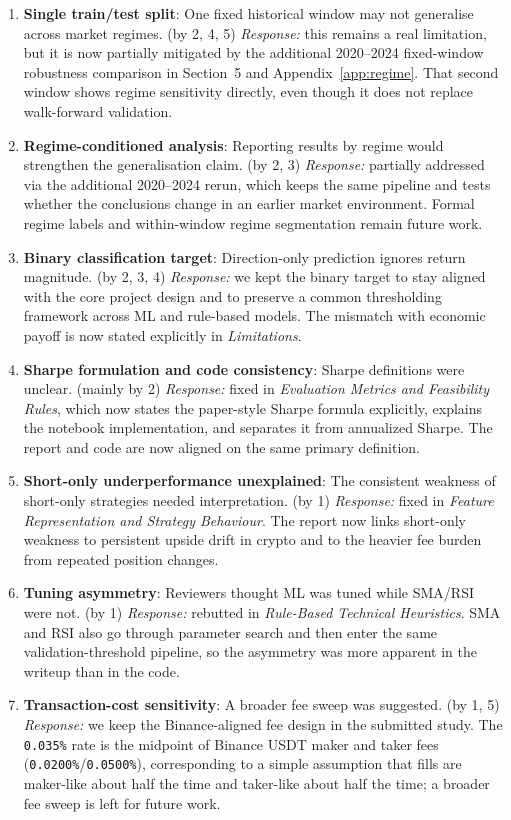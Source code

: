 \documentclass[12pt]{article}
\begin{document}
\begin{enumerate}[leftmargin=1.5em]
    \item \textbf{Single train/test split}: One fixed historical window may not generalise across market regimes. (by 2, 4, 5) \textit{Response:} this remains a real limitation, but it is now partially mitigated by the additional 2020--2024 fixed-window robustness comparison in Section~5 and Appendix~\ref{app:regime}. That second window shows regime sensitivity directly, even though it does not replace walk-forward validation.
    \item \textbf{Regime-conditioned analysis}: Reporting results by regime would strengthen the generalisation claim. (by 2, 3) \textit{Response:} partially addressed via the additional 2020--2024 rerun, which keeps the same pipeline and tests whether the conclusions change in an earlier market environment. Formal regime labels and within-window regime segmentation remain future work.
    \item \textbf{Binary classification target}: Direction-only prediction ignores return magnitude. (by 2, 3, 4) \textit{Response:} we kept the binary target to stay aligned with the core project design and to preserve a common thresholding framework across ML and rule-based models. The mismatch with economic payoff is now stated explicitly in \emph{Limitations}.
    \item \textbf{Sharpe formulation and code consistency}: Sharpe definitions were unclear. (mainly by 2) \textit{Response:} fixed in \emph{Evaluation Metrics and Feasibility Rules}, which now states the paper-style Sharpe formula explicitly, explains the notebook implementation, and separates it from annualized Sharpe. The report and code are now aligned on the same primary definition.
    \item \textbf{Short-only underperformance unexplained}: The consistent weakness of short-only strategies needed interpretation. (by 1) \textit{Response:} fixed in \emph{Feature Representation and Strategy Behaviour}. The report now links short-only weakness to persistent upside drift in crypto and to the heavier fee burden from repeated position changes.
    \item \textbf{Tuning asymmetry}: Reviewers thought ML was tuned while SMA/RSI were not. (by 1) \textit{Response:} rebutted in \emph{Rule-Based Technical Heuristics}. SMA and RSI also go through parameter search and then enter the same validation-threshold pipeline, so the asymmetry was more apparent in the writeup than in the code.
    \item \textbf{Transaction-cost sensitivity}: A broader fee sweep was suggested. (by 1, 5) \textit{Response:} we keep the Binance-aligned fee design in the submitted study. The \texttt{0.035\%} rate is the midpoint of Binance USDT maker and taker fees (\texttt{0.0200\%}/\texttt{0.0500\%}), corresponding to a simple assumption that fills are maker-like about half the time and taker-like about half the time; a broader fee sweep is left for future work.

\end{enumerate}
\end{document}
